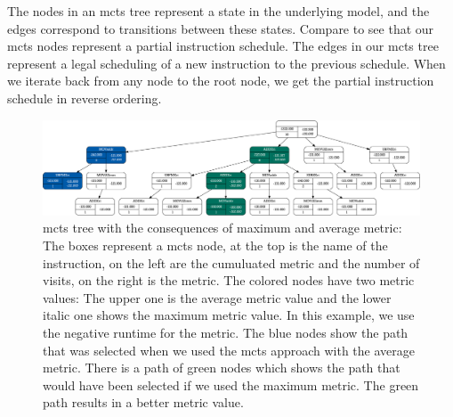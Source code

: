 The nodes in an \ac{mcts} tree represent a state in the underlying model, and the edges correspond to transitions between these states.
Compare  to see that our \ac{mcts} nodes represent a partial instruction schedule.
The edges in our \ac{mcts} tree represent a legal scheduling of a new instruction to the previous schedule.
When we iterate back from any node to the root node, we get the partial instruction schedule in reverse ordering.
\begin{figure}[p]
    \centering
    \includegraphics[width=18cm,angle=90]{data/mcts-max-vs-avg/svg/selected/8752639012199.inkscape-crop.pdf}
    \caption[\ac{mcts} Tree with the Consequences of Maximum and Average Metric]{
        \ac{mcts} tree with the consequences of maximum and average metric:
        The boxes represent a \ac{mcts} node, at the top is the name of the instruction, on the left are the cumuluated metric and the number of visits, on the right is the metric.
        The colored nodes have two metric values: The upper one is the average metric value and the lower italic one shows the maximum metric value.
        In this example, we use the negative runtime for the metric.
        The blue nodes show the path that was selected when we used the \ac{mcts} approach with the average metric.
        There is a path of green nodes which shows the path that would have been selected if we used the maximum metric.
        The green path results in a better metric value.
    }
    \label{fig:approach:max-vs-avg}
\end{figure}

